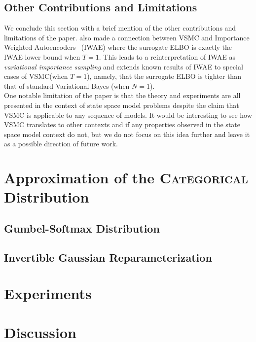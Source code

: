 \documentclass[12pt]{article}
\newcommand{\vsmc}{\textsc{VSMC}\xspace}
\newcommand{\elbo}{\textsc{ELBO}\xspace}
\newcommand{\categorical}{\textsc{Categorical}\xspace}
\newcommand{\iwae}{\textsc{IWAE}\xspace}
\begin{document}
\subsection{Other Contributions and Limitations}

We conclude this section with a brief mention of the other contributions and limitations of the paper. \textcite{Naesseth:2018} also made a connection between \vsmc and Importance Weighted Autoencoders~\parencite{Burda:2016} (\iwae) where the surrogate \elbo is exactly the \iwae lower bound when $T=1$. This leads to a reinterpretation of \iwae as \textit{variational importance sampling} and extends known results of \iwae to special cases of \vsmc (when $T=1$), namely, that the surrogate \elbo is tighter than that of standard Variational Bayes (when $N=1$).
\\

One notable limitation of the paper is that the theory and experiments are all presented in the context of state space model problems despite the claim that \vsmc is applicable to any sequence of models. It would be interesting to see how \vsmc translates to other contexts and if any properties observed in the state space model context do not, but we do not focus on this idea further and leave it as a possible direction of future work.

\section{Approximation of the \categorical Distribution}\label{sec:approx}

\subsection{Gumbel-Softmax Distribution}

\subsection{Invertible Gaussian Reparameterization}


\section{Experiments}\label{sec:experiments}


\section{Discussion}\label{sec:discussion}
\end{document}
